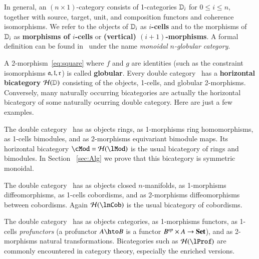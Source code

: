 \begin{rmk}\label{rmk:monglob}
  In general, an $(n\times 1)$-category consists of 1-categories
  $\mathbb{D}_i$ for $0\le i\le n$, together with source, target, unit, and
  composition functors and coherence isomorphisms.  We refer to the
  objects of $\mathbb{D}_i$ as \textbf{$i$-cells} and to the morphisms of
  $\mathbb{D}_i$ as \textbf{morphisms of $i$-cells} or \textbf{(vertical)
    $(i+1)$-morphisms}.  A formal definition can be found
  in~\cite{batanin:monglob} under the name \emph{monoidal $n$-globular
    category}.
\end{rmk}


A 2-morphism~\eqref{eq:square} where $f$ and $g$ are identities (such
as the constraint isomorphisms $\mathfrak{a},\mathfrak{l},\mathfrak{r}$) is called
\textbf{globular}.  Every double category \lD\ has a
\textbf{horizontal bicategory} $\mathcal{H}(\mathbb{D})$ consisting of the objects,
1-cells, and globular 2-morphisms.  Conversely, many naturally
occurring bicategories are actually the horizontal bicategory of some
naturally ocurring double category.  Here are just a few examples.

\begin{eg}
  The double category \lMod\ has as objects rings, as 1-morphisms ring
  homomorphisms, as 1-cells bimodules, and as 2-morphisms equivariant
  bimodule maps.  Its horizontal bicategory $\cMod = \cH(\lMod)$ is
  the usual bicategory of rings and bimodules. In Section ~\ref{sec:Alg} we prove that this bicategory is symmetric monoidal.
\end{eg}

\begin{eg}
  The double category \lnCob\ has as objects closed $n$-manifolds, as
  1-morphisms diffeomorphisms, as 1-cells cobordisms, and as
  2-morphisms diffeomorphisms between cobordisms.  Again $\cH(\lnCob)$
  is the usual bicategory of cobordisms.
\end{eg}

\begin{eg}
  The double category \lProf\ has as objects categories, as
  1-morphisms functors, as 1-cells \emph{profunctors} (a profunctor
  $A\hto B$ is a functor $B^{\mathit{op}}\times A\to \mathbf{Set}$), and as
  2-morphisms natural transformations.  Bicategories such as
  $\cH(\lProf)$ are commonly encountered in category theory,
  especially the enriched versions.
\end{eg}

